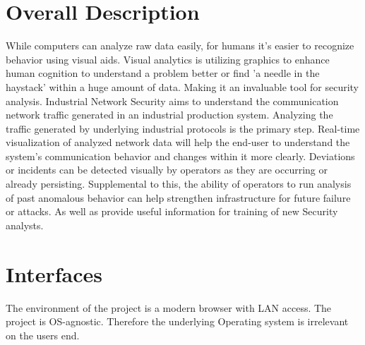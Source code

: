 \documentclass[twoside, english, draft]{Pflichtenheft}
\begin{document}
\section{Overall Description}

While computers can analyze raw data easily, for humans it's easier to recognize behavior using visual aids.
Visual analytics is utilizing graphics to enhance human cognition to understand a problem better or find 'a needle in the haystack' within a huge amount of data. Making it an invaluable tool for security analysis.
\newline
\newline
Industrial Network Security aims to understand the communication network traffic generated in an industrial production system. Analyzing the traffic generated by underlying industrial protocols is the primary step.
\newline
\newline
Real-time visualization of analyzed network data will help the end-user to understand the system's communication behavior and changes within it more clearly. Deviations or incidents can be detected visually by operators as they are occurring or already persisting.\newline
\newline
Supplemental to this, the ability of operators to run analysis of past anomalous behavior can help strengthen infrastructure for future failure or attacks. As well as provide useful information for training of new Security analysts.
\newpage
\section{Interfaces}


	The environment of the project is a modern browser with LAN access. The project is OS-agnostic. Therefore the underlying Operating system is irrelevant on the users end.
\end{document}
